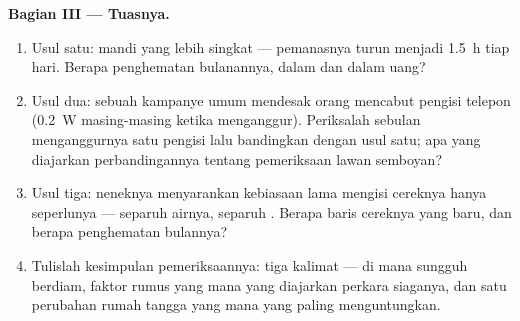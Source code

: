 \begin{problem}
\medskip\noindent\textbf{Bagian III --- Tuasnya.}
\begin{enumerate}[resume]
  \item Usul satu: mandi yang lebih singkat --- pemanasnya turun
        menjadi \qty{1.5}{h} tiap hari. Berapa penghematan bulanannya,
        dalam  dan dalam uang?
  \item Usul dua: sebuah kampanye umum mendesak orang mencabut pengisi
         telepon (\qty{0.2}{W} masing-masing ketika menganggur).
        Periksalah sebulan menganggurnya satu pengisi  lalu
        bandingkan dengan usul satu; apa yang diajarkan
        perbandingannya tentang pemeriksaan lawan semboyan?
  \item Usul tiga: neneknya menyarankan kebiasaan lama mengisi
        cereknya hanya seperlunya --- separuh airnya, separuh
        . Berapa baris cereknya yang baru, dan berapa
        penghematan bulannya?
  \item Tulislah kesimpulan pemeriksaannya: tiga kalimat --- di mana
         sungguh berdiam, faktor rumus yang mana yang
        diajarkan perkara siaganya, dan satu perubahan rumah tangga
        yang mana yang paling menguntungkan.
\end{enumerate}
\end{problem}
